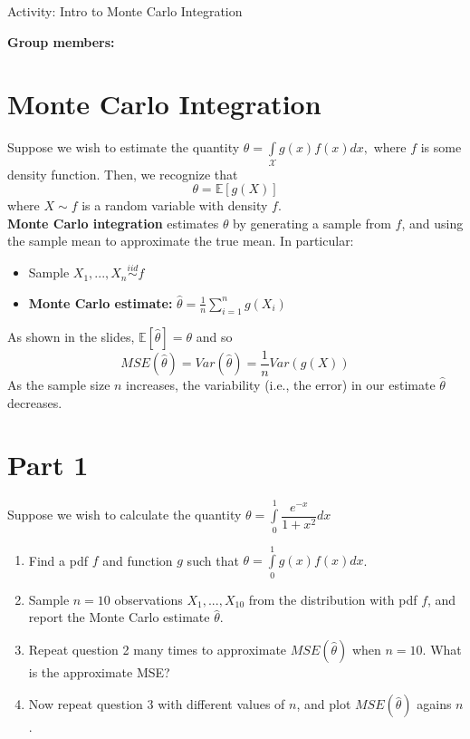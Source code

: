 \documentclass[12pt]{article}
\begin{document}
\begin{center}
\Large
Activity: Intro to Monte Carlo Integration \\
\normalsize
\vspace{5mm}
\end{center}

\noindent \textbf{Group members:}

\section*{Monte Carlo Integration}

Suppose we wish to estimate the quantity $\theta = \int \limits_{\mathcal{X}} g(x) f(x) dx,$ where $f$ is some density function. Then, we recognize that 
$$\theta = \mathbb{E}[g(X)]$$
where $X \sim f$ is a random variable with density $f$.\\

\noindent \textbf{Monte Carlo integration} estimates $\theta$ by generating a sample from $f$, and using the sample mean to approximate the true mean. In particular:

\begin{itemize}
\item Sample $X_1,...,X_n \overset{iid}{\sim} f$
\item \textbf{Monte Carlo estimate:} $\widehat{\theta} = \frac{1}{n} \sum \limits_{i=1}^n g(X_i)$
\end{itemize}

\noindent As shown in the slides, $\mathbb{E}[\widehat{\theta}] = \theta$ and so
$$MSE(\widehat{\theta}) = Var(\widehat{\theta}) = \frac{1}{n} Var(g(X))$$
As the sample size $n$ increases, the variability (i.e., the error) in our estimate $\widehat{\theta}$ decreases.

\section*{Part 1}

Suppose we wish to calculate the quantity $\theta = \int \limits_0^1 \dfrac{e^{-x}}{1 + x^2} dx$

\begin{enumerate}
\item Find a pdf $f$ and function $g$ such that $\theta = \int \limits_0^1 g(x) f(x) dx$.

\newpage

\item Sample $n=10$ observations $X_1,...,X_{10}$ from the distribution with pdf $f$, and report the Monte Carlo estimate $\widehat{\theta}$.

\vspace{3cm}

\item Repeat question 2 many times to approximate $MSE(\widehat{\theta})$ when $n = 10$. What is the approximate MSE?

\vspace{3cm}

\item Now repeat question 3 with different values of $n$, and plot $MSE(\widehat{\theta})$ agains $n$. 

\end{enumerate}
\end{document}
